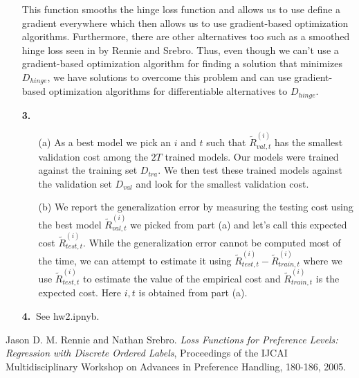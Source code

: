 \documentclass [10pt]{article}
\begin{document}
\begin{enumerate}
	This function smooths the hinge loss function and allows us to use define a gradient everywhere which then allows us to use gradient-based optimization algorithms. Furthermore, there are other alternatives too such as a smoothed hinge loss seen in \cite{lossfunction} by Rennie and Srebro. Thus, even though we can't use a gradient-based optimization algorithm for finding a solution that minimizes $D_{hinge}$, we have solutions to overcome this problem and can use gradient-based optimization algorithms for differentiable alternatives to $D_{hinge}$.
	\item[\textbf{3.$\>$}]
	\begin{enumerate}
		\item[(a)]As a best model we pick an $i$ and $t$ such that $\tilde{R}^{(i)}_{val,t}$ has the smallest validation cost among the $2T$ trained models. Our models were trained against the training set $D_{tra}$. We then test these trained models against the validation set $D_{val}$ and look for the smallest validation cost.
		\item[(b)]We report the generalization error by measuring the testing cost using the best model $\tilde{R}^{(i)}_{val,t}$ we picked from part (a) and let's call this expected cost $\tilde{R}^{(i)}_{test,t}$. While the generalization error cannot be computed most of the time, we can attempt to estimate it using $\tilde{R}^{(i)}_{test,t} - \tilde{R}^{(i)}_{train,t}$ where we use $\tilde{R}^{(i)}_{test,t}$ to estimate the value of the empirical cost and $\tilde{R}^{(i)}_{train,t}$ is the expected cost. Here $i,t$ is obtained from part (a).
	\end{enumerate}
	\item[\textbf{4.$\>$}] See hw2.ipnyb.
\end{enumerate}

\begin{thebibliography}{5}
    Jason D. M. Rennie and Nathan Srebro.
    \textit{Loss Functions for Preference Levels: Regression with Discrete Ordered Labels},
    Proceedings of the IJCAI Multidisciplinary Workshop on Advances in Preference Handling,
		180-186,
    2005.
\end{thebibliography}
\end{document}
